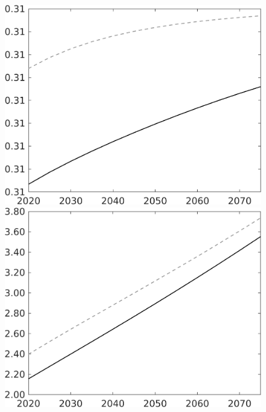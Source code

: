 \documentclass[12pt]{article}
\begin{document}
\begin{figure}[h!!]
\begin{minipage}[]{0.32\textwidth}
	\end{minipage}	
\begin{minipage}[]{0.32\textwidth}
\includegraphics[width=1\textwidth]{../../codding_model/own_basedOnFried/optimalPol_010922_revision/figures/all_13Sept22/LevTaufNoTauf_TaulCalib_Equlab_regime0_hl_spillover0_nsk0_xgr0_knspil1_sep1_LFlimit0_emsbase0_countec0_GovRev0_etaa0.79_lgd0.png}
\end{minipage}	
	\begin{minipage}[]{0.32\textwidth}
		\includegraphics[width=1\textwidth]{../../codding_model/own_basedOnFried/optimalPol_010922_revision/figures/all_13Sept22/LevTaufNoTauf_TaulCalib_Equlab_regime0_wh_spillover0_nsk0_xgr0_knspil1_sep1_LFlimit0_emsbase0_countec0_GovRev0_etaa0.79_lgd0.png}

\end{minipage}
\end{figure}
\end{document}
